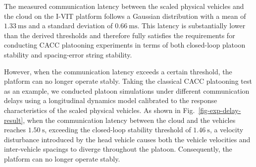\documentclass[11pt]{article}
\begin{document}
The measured communication latency between the scaled physical vehicles and the cloud on the I-VIT platform follows a Gaussian distribution with a mean of $1.33~\mathrm{ms}$ and a standard deviation of $0.66~\mathrm{ms}$. 
This latency is substantially lower than the derived thresholds and therefore fully satisfies the requirements for conducting CACC platooning experiments in terms of both closed-loop platoon stability and spacing-error string stability.

However, when the communication latency exceeds a certain threshold, the platform can no longer operate stably. 
Taking the classical CACC platooning test as an example, 
we conducted platoon simulations under different communication delays using a longitudinal dynamics model calibrated to the response characteristics of the scaled physical vehicles. As shown in Fig.~\ref{fig-exp-delay-result}, when the communication latency between the cloud and the vehicles reaches $1.50~\mathrm{s}$, exceeding the closed-loop stability threshold of $1.46~\mathrm{s}$, a velocity disturbance introduced by the head vehicle causes both the vehicle velocities and inter-vehicle spacings to diverge throughout the platoon. Consequently, the platform can no longer operate stably.
\end{document}
